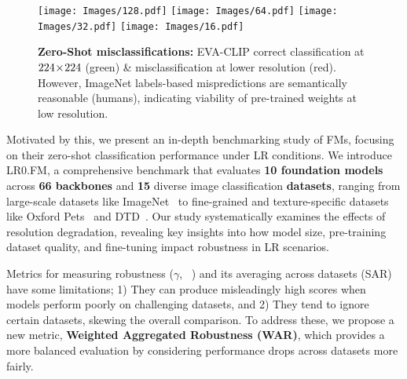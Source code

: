 \begin{figure}[!tb]
\centering
\subfloat
{
\texttt{[image: Images/128.pdf]}
\label{fig:128_ex}
}
\hfill
\subfloat
{
\texttt{[image: Images/64.pdf]}
\label{fig:32_ex}
}
\hfill
\subfloat
{
\texttt{[image: Images/32.pdf]}
\label{fig:32_ex}
}
\hfill
\subfloat
{
\texttt{[image: Images/16.pdf]}
\label{fig:32_ex}
}
\vspace{-2pt}
\caption{\textbf{Zero-Shot misclassifications:} 
EVA-CLIP  correct classification at $224\!\times\!224$ (green) \& misclassification at lower resolution (red). However, ImageNet labels-based mispredictions are semantically reasonable (humans), indicating viability of pre-trained weights at low resolution.
}
\label{fig:img_ex}
\vspace{-9pt}
\end{figure}
Motivated by this, we present an in-depth benchmarking study of FMs, focusing on their zero-shot classification performance under LR conditions. 
We introduce LR0.FM, a comprehensive benchmark that evaluates \textbf{10 foundation models} across \textbf{66 backbones} and \textbf{15} diverse image classification \textbf{datasets}, ranging from large-scale datasets like ImageNet~\citep{deng2009imagenet} to fine-grained and texture-specific datasets like 
Oxford Pets~\citep{parkhi2012cats} and DTD~\citep{cimpoi2014describing}. 
Our study systematically examines the effects of resolution degradation, revealing key insights into how model size, pre-training dataset quality, and fine-tuning impact robustness in LR scenarios.

Metrics for measuring  robustness ($\gamma$, ~\cite{schiappa2024robustness}) and its averaging across datasets (SAR)
have some limitations; 1) They can produce misleadingly high scores when models perform poorly on challenging datasets, and 2) They tend to ignore certain datasets, skewing the overall comparison. To address these, we propose a new metric, \textbf{Weighted Aggregated Robustness (WAR)}, which provides a more balanced evaluation by considering performance drops across datasets more fairly. %

